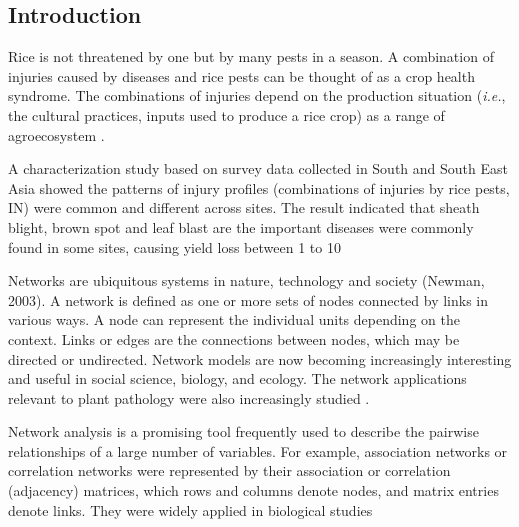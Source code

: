 
\subsection*{Introduction}

Rice is not threatened by one but by many pests in a season. A combination of injuries caused by diseases and rice pests can be thought of as a crop health syndrome. The combinations of injuries depend on the production situation (\textit{i.e.}, the cultural practices, inputs used to produce a rice crop) as a range of agroecosystem \citep{Savary_2006_Quantification}.

A characterization study based on survey data collected in South and South East Asia \citep{Savary_2000_Characterization} showed the patterns of injury profiles (combinations of injuries by rice pests, IN) were common and different across sites. The result indicated that sheath blight, brown spot and leaf blast are the important diseases were commonly found in some sites, causing yield loss between 1 to 10%

Networks are ubiquitous systems in nature, technology and society (Newman, 2003). A network is defined as one or more sets of nodes connected by links in various ways. A node can represent the individual units depending on the context. Links or edges are the connections between nodes, which may be directed or undirected. Network models are now becoming increasingly interesting and useful in social science, biology, and ecology. The network applications relevant to plant pathology were also increasingly studied \citep{Moslonka_Lefebvre_2011}.

Network analysis is a promising tool frequently used to describe the pairwise relationships of a large number of variables. For example, association networks or correlation networks were represented by their association or correlation (adjacency) matrices, which rows and columns denote nodes, and matrix entries denote links. They were widely applied in biological studies \citep{Toubiana_2013_Net,Barabasi_2004_Network}

